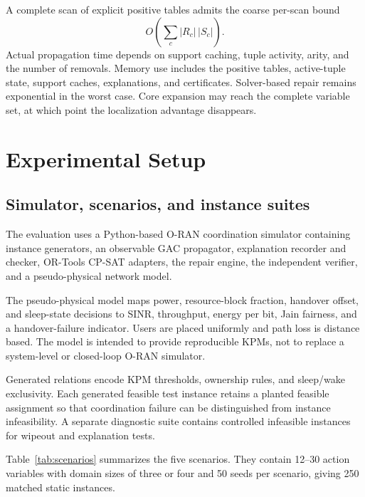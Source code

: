 \documentclass[pdflatex,sn-mathphys-num,iicol,oneside]{sn-jnl}
\newcommand{\gac}{\textsc{GAC}\xspace}
\newcommand{\cpsat}{\textsc{CP-SAT}\xspace}
\begin{document}
A complete scan of explicit positive tables admits the coarse per-scan bound
\begin{equation}
O\left(
\sum_{c}
|R_c|\,|S_c|
\right).
\end{equation}
Actual propagation time depends on support caching, tuple activity,
arity, and the number of removals. Memory use includes the positive
tables, active-tuple state, support caches, explanations, and
certificates. Solver-based repair remains exponential in the worst
case. Core expansion may reach the complete variable set, at which
point the localization advantage disappears.

\section{Experimental Setup}
\label{sec:experiments}

\subsection{Simulator, scenarios, and instance suites}

The evaluation uses a Python-based O-RAN coordination simulator
containing instance generators, an observable \gac propagator,
explanation recorder and checker, OR-Tools \cpsat adapters, the repair
engine, the independent verifier, and a pseudo-physical network model.

The pseudo-physical model maps power, resource-block fraction,
handover offset, and sleep-state decisions to SINR, throughput, energy
per bit, Jain fairness, and a handover-failure indicator. Users are
placed uniformly and path loss is distance based. The model is
intended to provide reproducible KPMs, not to replace a system-level
or closed-loop O-RAN simulator.

Generated relations encode KPM thresholds, ownership rules, and
sleep/wake exclusivity. Each generated feasible test instance retains
a planted feasible assignment so that coordination failure can be
distinguished from instance infeasibility. A separate diagnostic suite
contains controlled infeasible instances for wipeout and explanation
tests.

Table~\ref{tab:scenarios} summarizes the five scenarios. They contain
12--30 action variables with domain sizes of three or four and 50
seeds per scenario, giving 250 matched static instances.
\end{document}
